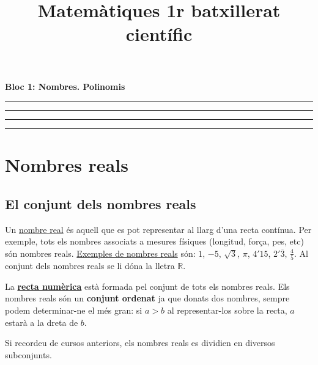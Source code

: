 \documentclass[]{article}
\title{Matemàtiques 1r batxillerat científic}
\date{}
\begin{document}
\maketitle

{
\hypersetup{linkcolor=black}
\setcounter{tocdepth}{3}
\tableofcontents
}
\textbf{Bloc 1: Nombres. Polinomis}

\begin{center}\rule{0.5\linewidth}{\linethickness}\end{center}

\begin{center}\rule{0.5\linewidth}{\linethickness}\end{center}

\begin{center}\rule{0.5\linewidth}{\linethickness}\end{center}

\begin{center}\rule{0.5\linewidth}{\linethickness}\end{center}

\section{Nombres reals}\label{nombres-reals}

\subsection{El conjunt dels nombres
reals}\label{el-conjunt-dels-nombres-reals}

Un \href{https://en.wikipedia.org/wiki/Real_number}{nombre real} és
aquell que es pot representar al llarg d'una recta contínua. Per
exemple, tots els nombres associats a mesures físiques (longitud, força,
pes, etc) són nombres reals.
\href{http://www.mathsisfun.com/numbers/real-numbers.html}{Exemples de
nombres reals} són: \(1\), \(-5\), \(\sqrt{3}\), \(\pi\), \(4'15\),
\(2'\overline{3}\), \(\frac{4}{5}\). Al conjunt dels nombres reals se li
dóna la lletra \textbf{\(\mathbb{R}\)}.

La
\href{https://ca.wikipedia.org/wiki/Recta_num\%C3\%A8rica}{\textbf{recta
numèrica}} està formada pel conjunt de tots els nombres reals. Els
nombres reals són un \textbf{conjunt ordenat} ja que donats dos nombres,
sempre podem determinar-ne el més gran: si \(a \gt b\) al
representar-los sobre la recta, \(a\) estarà a la dreta de \(b\).

Si recordeu de cursos anteriors, els nombres reals es dividien en
diversos subconjunts.
\end{document}
